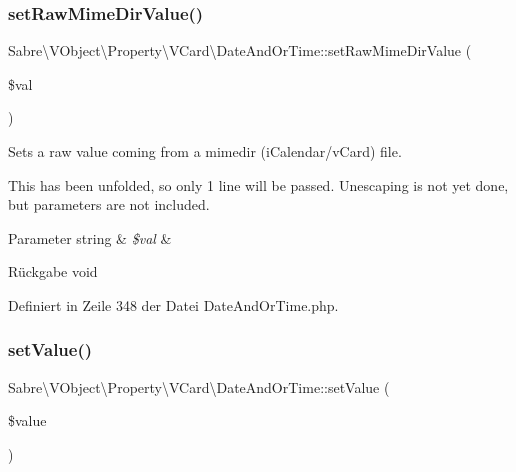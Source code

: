 \subsubsection{\texorpdfstring{set\+Raw\+Mime\+Dir\+Value()}{setRawMimeDirValue()}}
{\footnotesize\ttfamily Sabre\textbackslash{}\+V\+Object\textbackslash{}\+Property\textbackslash{}\+V\+Card\textbackslash{}\+Date\+And\+Or\+Time\+::set\+Raw\+Mime\+Dir\+Value (\begin{DoxyParamCaption}\item[{}]{\$val }\end{DoxyParamCaption})}

Sets a raw value coming from a mimedir (i\+Calendar/v\+Card) file.

This has been \textquotesingle{}unfolded\textquotesingle{}, so only 1 line will be passed. Unescaping is not yet done, but parameters are not included.


\begin{DoxyParams}[1]{Parameter}
string & {\em \$val} & \\
\hline
\end{DoxyParams}
\begin{DoxyReturn}{Rückgabe}
void 
\end{DoxyReturn}


Definiert in Zeile 348 der Datei Date\+And\+Or\+Time.\+php.

\mbox{\label{class_sabre_1_1_v_object_1_1_property_1_1_v_card_1_1_date_and_or_time_af8121bf2ee807a2098530f6b70173813}} 
\subsubsection{\texorpdfstring{set\+Value()}{setValue()}}
{\footnotesize\ttfamily Sabre\textbackslash{}\+V\+Object\textbackslash{}\+Property\textbackslash{}\+V\+Card\textbackslash{}\+Date\+And\+Or\+Time\+::set\+Value (\begin{DoxyParamCaption}\item[{}]{\$value }\end{DoxyParamCaption})}

